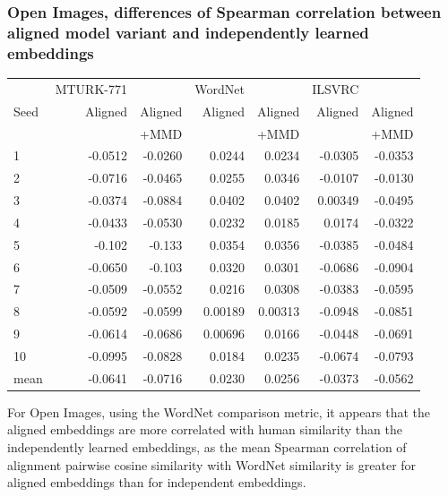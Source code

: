 \subsubsection{Open Images, differences of Spearman correlation between aligned model variant and independently learned embeddings}


\begin{table}[H]
\begin{tabular}{lrrrrrr}
  \toprule
       &   MTURK-771 &           &  WordNet  &           &  ILSVRC  &            \\
{Seed} &   Aligned   &  Aligned  &   Aligned &  Aligned  &  Aligned &  Aligned   \\
{}     &             & +MMD      &            & +MMD     &          &   +MMD     \\
\midrule
1    &     -0.0512 &    -0.0260  &   0.0244 &     0.0234 &    -0.0305 &    -0.0353   \\
2    &     -0.0716 &    -0.0465  &   0.0255 &     0.0346 &    -0.0107 &    -0.0130   \\
3    &     -0.0374 &    -0.0884  &   0.0402 &     0.0402 &     0.00349 &    -0.0495   \\
4    &     -0.0433 &    -0.0530  &   0.0232 &     0.0185 &     0.0174 &    -0.0322   \\
5    &     -0.102  &    -0.133   &   0.0354 &     0.0356 &    -0.0385 &    -0.0484   \\
6    &     -0.0650 &    -0.103   &   0.0320 &     0.0301 &    -0.0686 &    -0.0904   \\
7    &     -0.0509 &    -0.0552  &   0.0216 &     0.0308 &    -0.0383 &    -0.0595   \\
8    &     -0.0592 &    -0.0599  &   0.00189 &    0.00313 &   -0.0948 &    -0.0851   \\
9    &     -0.0614 &    -0.0686  &   0.00696 &    0.0166 &    -0.0448 &    -0.0691   \\
10   &     -0.0995 &    -0.0828  &   0.0184 &     0.0235 &    -0.0674 &    -0.0793   \\
\midrule                                                                                          
mean &     -0.0641 &    -0.0716  &   0.0230 &     0.0256 &    -0.0373 &    -0.0562   \\
\bottomrule
\end{tabular}
\end{table}


For Open Images, using the WordNet comparison metric, it appears that the aligned embeddings are more correlated with human similarity than the independently learned embeddings, as the mean Spearman correlation of alignment pairwise cosine similarity with WordNet similarity is greater for aligned embeddings than for independent embeddings. 

